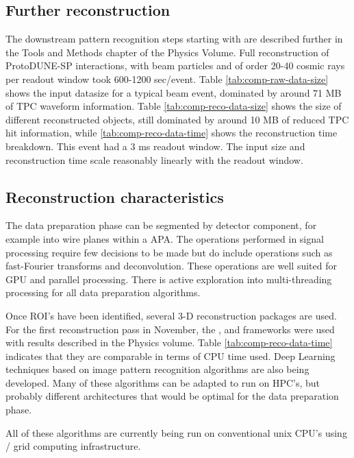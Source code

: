 \subsection{Further reconstruction}
The downstream pattern recognition steps starting with  are described further in the Tools and Methods chapter of the Physics Volume.  
Full reconstruction of ProtoDUNE-SP interactions, with beam particles and of order 20-40 cosmic rays per readout window took 600-1200 sec/event.
Table  \ref{tab:comp-raw-data-size} shows the input datasize for a typical beam event, dominated by around 71 MB of TPC waveform information. Table  \ref{tab:comp-reco-data-size} shows the size of different reconstructed objects, still dominated by around 10 MB of reduced TPC hit information,  while \ref{tab:comp-reco-data-time} shows the reconstruction time breakdown.  This event had a 3 ms readout window.  The input size and reconstruction time scale reasonably linearly with the readout window.  

\subsection{Reconstruction characteristics}

The data preparation phase can be segmented by detector component, for example into wire planes within a APA.  The operations performed in signal processing require few decisions to be made but do include operations such as fast-Fourier transforms and deconvolution.  These operations are well suited for GPU and parallel processing. There is active exploration into multi-threading processing for all data preparation algorithms.


Once ROI's have been identified, several 3-D reconstruction packages are used. For the first reconstruction pass in November, the  \cite{Acciarri:2017hat}, \cite{wirecell} and \cite{ref:PMA}  frameworks were used with results described in the Physics volume.   Table \ref{tab:comp-reco-data-time} indicates that they are comparable in terms of CPU time used.   Deep Learning techniques based on image pattern recognition algorithms are also being developed. Many of these algorithms can be adapted to run on HPC's, but probably different architectures that would be optimal for the data preparation phase. 

All of these algorithms are currently being run on conventional unix CPU's using / grid computing  infrastructure. 




